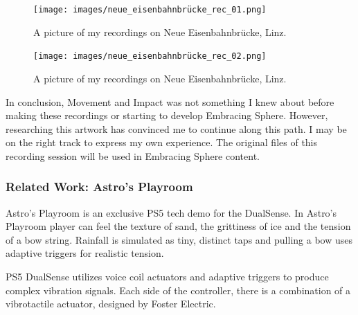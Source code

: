                 \begin{figure}[H]
                    \centering
                    \texttt{[image: images/neue\_eisenbahnbrücke\_rec\_01.png]}
                    \caption{A picture of my recordings on Neue Eisenbahnbrücke, Linz.}
                    \label{fig:BRUCKELINZREC_01}
                \end{figure}

                \begin{figure}[H]
                    \centering
                    \texttt{[image: images/neue\_eisenbahnbrücke\_rec\_02.png]}
                    \caption{A picture of my recordings on Neue Eisenbahnbrücke, Linz.}
                    \label{fig:BRUCKELINZREC_02}
                \end{figure}

                In conclusion, Movement and Impact was not something I knew about before making these recordings or starting to develop Embracing Sphere. However, researching this artwork has convinced me to continue along this path. I may be on the right track to express my own experience. The original files of this recording session will be used in Embracing Sphere content.\par
            \subsubsection{Related Work: Astro's Playroom}
                Astro's Playroom is an exclusive PS5 tech demo for the DualSense. In Astro's Playroom player can feel the texture of sand, the grittiness of ice and the tension of a bow string. Rainfall is simulated as tiny, distinct taps and pulling a bow uses adaptive triggers for realistic tension.\par

                PS5 DualSense utilizes voice coil actuators and adaptive triggers to produce complex vibration signals\cite{What_is_under_Dualsense}. Each side of the controller, there is a combination of a vibrotactile actuator, designed by Foster Electric.\par
                
